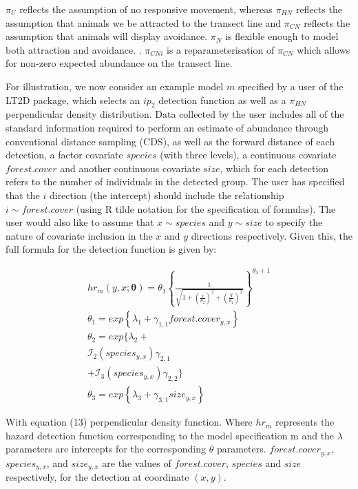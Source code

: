 \documentclass[11pt]{article}
\begin{document}
\begin{multicols}{2}
$\pi_U$ reflects the assumption of no responsive movement, whereas $\pi_{HN}$ reflects the assumption that animals we be attracted to the transect line and $\pi_{CN}$ reflects the assumption that animals will display avoidance. $\pi_N$ is flexible enough to model both attraction and avoidance. \cite{Borchers}. $\pi_{CNi}$ is a reparameterisation of $\pi_{CN}$ which allows for non-zero expected abundance on the transect line.

For illustration, we now consider an example model $m$ specified by a user of the LT2D package, which selects an $ip_2$ detection function as well as a $\pi_{HN}$ perpendicular density distribution. Data collected by the user includes all of the standard information required to perform an estimate of abundance through conventional distance sampling (CDS), as well as the forward distance of each detection, a factor covariate $species$ (with three levels), a continuous covariate $forest.cover$ and another continuous covariate $size$, which for each detection refers to the number of individuals in the detected group. The user has specified that the $i$ direction (the intercept) should include the relationship $i\sim forest.cover$ (using R tilde notation for the specification of formulas). The user would also like to assume that $x\sim species$ and $y\sim size$ to specify the nature of covariate inclusion in the $x$ and $y$ directions respectively. Given this, the full formula for the detection function is given by:

\begin{multline}
hr_m\left(y,x;\boldsymbol{\theta}\right) = \theta_1\left\{\frac{1}{\sqrt{1+\left(\frac{x}{\theta_2}\right)^2+\left(\frac{y}{\theta_4}\right)^2}}\right\}^{\theta_3 + 1}\\\theta_1=exp\left\{{\lambda_1 + \gamma_{1,1}forest.cover_{y,x}}\right\} \\\theta_2 = exp\{\lambda_2 + \\\mathcal{I}_2\left(species_{y,x}\right)\gamma_{2,1}\\ +\mathcal{I}_3\left(species_{y,x}\right)\gamma_{2,2}\}  \\\theta_3 = exp\left\{\lambda_3 + \gamma_{3,1}size_{y,x}\right\}
\end{multline}

With equation (13) perpendicular density function. Where $hr_m$ represents the hazard detection function corresponding to the model specification m and the $\lambda$ parameters are intercepts for the corresponding $\theta$ parameters. $forest.cover_{y,x}$, $species_{y,x}$, and $size_{y,x}$ are the values of $forest.cover$, $species$ and $size$ respectively, for the detection at coordinate $(x,y)$.


\end{multicols}
\end{document}
